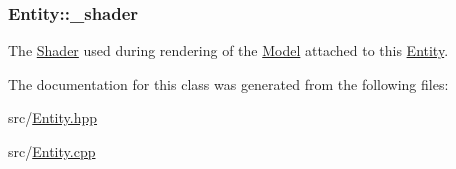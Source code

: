 \subsubsection[{\texorpdfstring{\+\_\+shader}{_shader}}]{ Entity\+::\+\_\+shader\hspace{0.3cm}{\ttfamily [private]}}\hypertarget{classEntity_ab9ecb7acfe7e9dafa0bec250d4a9d46d}{}\label{classEntity_ab9ecb7acfe7e9dafa0bec250d4a9d46d}
The \hyperlink{classShader}{Shader} used during rendering of the \hyperlink{classModel}{Model} attached to this \hyperlink{classEntity}{Entity}. 

The documentation for this class was generated from the following files\+:\begin{DoxyCompactItemize}
\item 
src/\hyperlink{Entity_8hpp}{Entity.\+hpp}\item 
src/\hyperlink{Entity_8cpp}{Entity.\+cpp}\end{DoxyCompactItemize}
